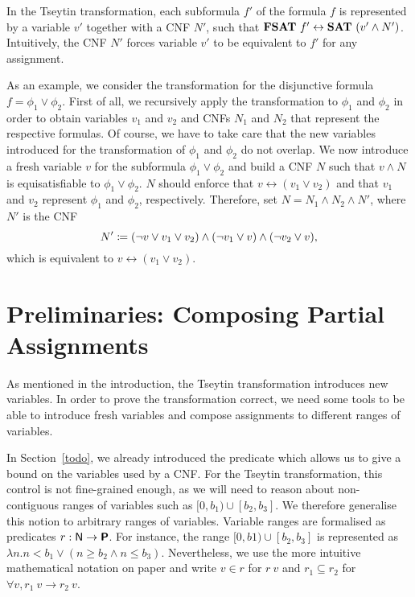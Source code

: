 In the Tseytin transformation, each subformula $f'$ of the formula $f$ is represented by a variable $v'$ together with a CNF $N'$, such that $\textbf{FSAT}{}~f' \leftrightarrow \textbf{SAT}{}~(v' \land N')$. Intuitively, the CNF $N'$ forces variable $v'$ to be equivalent to $f'$ for any assignment.
\begin{example}
  As an example, we consider the transformation for the disjunctive formula $f = \phi_1 \lor \phi_2$. First of all, we recursively apply the transformation to $\phi_1$ and $\phi_2$ in order to obtain variables $v_1$ and $v_2$ and CNFs $N_1$ and $N_2$ that represent the respective formulas. Of course, we have to take care that the new variables introduced for the transformation of $\phi_1$ and $\phi_2$ do not overlap.
  We now introduce a fresh variable $v$ for the subformula $\phi_1 \lor \phi_2$ and build a CNF $N$ such that $v \land N$ is equisatisfiable to $\phi_1 \lor \phi_2$. $N$ should enforce that $v \leftrightarrow (v_1 \lor v_2)$ and that $v_1$ and $v_2$ represent $\phi_1$ and $\phi_2$, respectively.
  Therefore, set $N = N_1 \land N_2 \land N'$, where $N'$ is the CNF 
  \[ N' \coloneqq (\lnot v \lor v_1 \lor v_2) \land (\lnot v_1  \lor v) \land (\lnot v_2 \lor v), \]
  which is equivalent to $v \leftrightarrow (v_1 \lor v_2)$.
\end{example}

\section{Preliminaries: Composing Partial Assignments}
As mentioned in the introduction, the Tseytin transformation introduces new variables. In order to prove the transformation correct, we need some tools to be able to introduce fresh variables and compose assignments to different ranges of variables.

In Section~\ref{todo}, we already introduced the predicate \varBound{} which allows us to give a bound on the variables used by a CNF. For the Tseytin transformation, this control is not fine-grained enough, as we will need to reason about non-contiguous ranges of variables such as $[0, b_1) \cup [b_2, b_3]$. We therefore generalise this notion to arbitrary ranges of variables.
Variable ranges are formalised as predicates $r : \mathsf{N} \rightarrow \textsf{\bfseries P}$. For instance, the range $[0, b1) \cup [b_2, b_3]$ is represented as $\lambda n. n < b_1 \lor (n \ge b_2 \land n \le b_3)$. Nevertheless, we use the more intuitive mathematical notation on paper and write $v \in r$ for $r~v$ and $r_1 \subseteq r_2$ for $\forall v, r_1~v \rightarrow r_2~v$.

